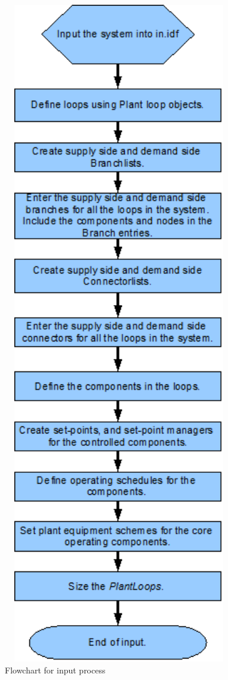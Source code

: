 \begin{figure}[hbtp]
\includegraphics[width=0.9\textwidth, height=0.9\textheight, keepaspectratio=true]{media/image011.png}
\caption{Flowchart for input process \protect \label{fig:flowchart-for-input-process}}
\end{figure}
